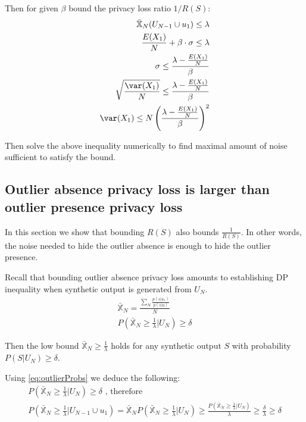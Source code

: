 \documentclass[11pt]{article}
\begin{document}
Then for given $\beta$ bound the privacy loss ratio $1/R(S)$:
\begin{align}
\bar{\mathbb{X}}_N(U_{N-1} \cup u_1) \le \lambda \\
\frac{E(X_1) }{N}+ \beta \cdot \sigma \le \lambda \\
\sigma \le \frac{\lambda - \frac{E(X_1)}{N}}{\beta} \\
\sqrt{\frac{\var(X_1)}{N}} \le \frac{\lambda - \frac{E(X_1)}{N}}{\beta} \\
\var(X_1) \le N \left ( \frac{\lambda - \frac{E(X_1)}{N}}{\beta} \right )^2 \\
\end{align}

Then solve the above inequality numerically to find maximal amount of noise sufficient to satisfy the bound.  

\subsection{Outlier absence privacy loss is larger than outlier presence privacy loss}

In this section we show that bounding $R(S)$ also bounds $\frac{1}{R(S)}$.  In other words, the noise needed to hide the outlier absence is enough to hide the outlier presence. 

Recall that bounding outlier absence privacy loss amounts to establishing DP inequality when synthetic output is generated from $U_N$.
\begin{align}
\bar{\mathbb{X}}_N = \frac{\sum_N  \frac{ p(s | u_1) } { p(s | u) }}{N}  \\
 P \left ( \bar{\mathbb{X}}_N  \ge  \frac{1}{\lambda} \bigg | U_N \right) \ge \delta
 \end{align}

Then the low bound $\bar{\mathbb{X}}_N \ge \frac{1}{\lambda}$ holds for any synthetic output $S$ with probability $P(S|U_N) \ge \delta$.

Using \eqref{eq:outlierProbs} we deduce the following:
\begin{align}
P\left ( \bar{\mathbb{X}}_N \ge \frac{1}{\lambda}  \bigg | U_N \right) \ge \delta \text{ , therefore }\\
P\left ( \bar{\mathbb{X}}_N \ge \frac{1}{\lambda}  \bigg | U_{N-1} \cup u_1 \right)  = \bar{\mathbb{X}}_N P\left ( \bar{\mathbb{X}}_N \ge \frac{1}{\lambda}  \bigg | U_N \right)  \ge  \frac{P\left ( \bar{\mathbb{X}}_N \ge \frac{1}{\lambda}  \bigg | U_N \right) }{\lambda}  \ge \frac{ \delta}{ \lambda} \ge \delta
 \end{align}
 
\end{document}
